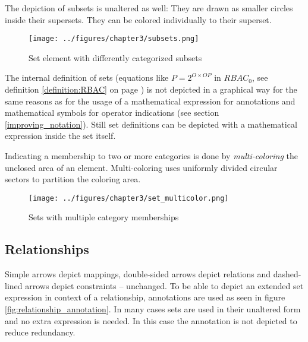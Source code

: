 \documentclass[twoside, openright, 12pt]{book}
\begin{document}
\noindent
The depiction of subsets is unaltered as well: They are drawn as smaller circles inside their supersets.
They can be colored individually to their superset.\\

\begin{figure}[htb]
	\centering
	\texttt{[image: ../figures/chapter3/subsets.png]}
	\caption{Set element with differently categorized subsets}
	\label{fig:subsets}
\end{figure}

\noindent
The internal definition of sets (equations like $P = 2^{O \times OP}$ in $RBAC_0$, see definition \ref{definition:RBAC} on page \pageref{definition:RBAC}) is not depicted in a graphical way for the same reasons as for the usage of a mathematical expression for annotations and mathematical symbols for operator indications (see section \ref{improving_notation}).
Still set definitions can be depicted with a mathematical expression inside the set itself.%
%

Indicating a membership to two or more categories is done by \textit{multi-coloring} the unclosed area of an element.
Multi-coloring uses uniformly divided circular sectors to partition the coloring area.

\begin{figure}[htb]
	\centering
	\texttt{[image: ../figures/chapter3/set\_multicolor.png]}
	\caption{Sets with multiple category memberships}
	\label{fig:set_multicolor}
\end{figure}


\subsection{Relationships}
Simple arrows depict mappings, double-sided arrows depict relations and dashed-lined arrows depict constraints -- unchanged.
To be able to depict an extended set expression in context of a relationship, annotations are used as seen in figure \ref{fig:relationship_annotation}.
In many cases sets are used in their unaltered form and no extra expression is needed.
In this case the annotation is not depicted to reduce redundancy.
\end{document}
